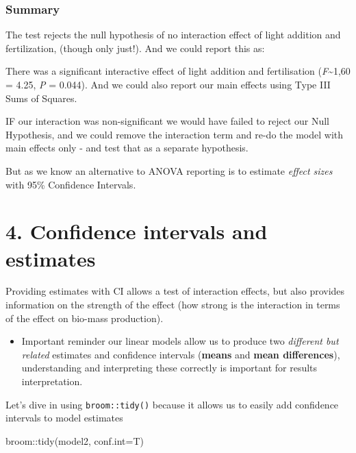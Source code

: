 \documentclass[
]{article}
\newenvironment{Shaded}{\begin{snugshade}}{\end{snugshade}}
\newcommand{\AttributeTok}[1]{\textcolor[rgb]{0.77,0.63,0.00}{#1}}
\newcommand{\FunctionTok}[1]{\textcolor[rgb]{0.00,0.00,0.00}{#1}}
\newcommand{\NormalTok}[1]{#1}
\newcommand{\SpecialCharTok}[1]{\textcolor[rgb]{0.00,0.00,0.00}{#1}}
\providecommand{\tightlist}{%
  \setlength{\itemsep}{0pt}\setlength{\parskip}{0pt}}
\begin{document}
\hypertarget{summary}{%
\subsubsection{Summary}\label{summary}}

The test rejects the null hypothesis of no interaction effect of light
addition and fertilization, (though only just!). And we could report
this as:

There was a significant interactive effect of light addition and
fertilisation (\emph{F}\textasciitilde1,60 = 4.25, \emph{P} = 0.044).
And we could also report our main effects using Type III Sums of
Squares.

IF our interaction was non-significant we would have failed to reject
our Null Hypothesis, and we could remove the interaction term and re-do
the model with main effects only - and test that as a separate
hypothesis.

But as we know an alternative to ANOVA reporting is to estimate
\emph{effect sizes} with 95\% Confidence Intervals.

\hypertarget{confidence-intervals-and-estimates}{%
\section{4. Confidence intervals and
estimates}\label{confidence-intervals-and-estimates}}

Providing estimates with CI allows a test of interaction effects, but
also provides information on the strength of the effect (how strong is
the interaction in terms of the effect on bio-mass production).

\begin{itemize}
\tightlist
\item
  Important reminder our linear models allow us to produce two
  \emph{different but related} estimates and confidence intervals
  (\textbf{means} and \textbf{mean differences}), understanding and
  interpreting these correctly is important for results interpretation.
\end{itemize}

Let's dive in using \texttt{broom::tidy()} because it allows us to
easily add confidence intervals to model estimates

\begin{Shaded}
\begin{Highlighting}[]
\NormalTok{broom}\SpecialCharTok{::}\FunctionTok{tidy}\NormalTok{(model2, }\AttributeTok{conf.int=}\NormalTok{T)}
\end{Highlighting}
\end{Shaded}
\end{document}
